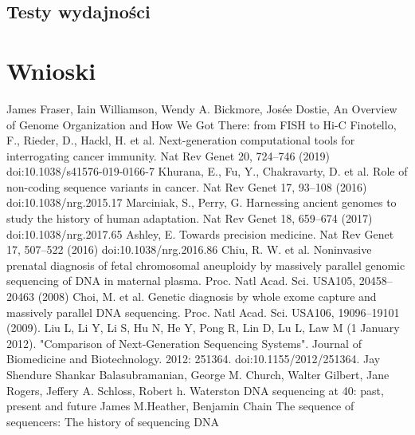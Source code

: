 \documentclass[a4paper,11pt,twoside]{report}
\theoremstyle{definition}
\begin{document}
\section*{Testy wydajności}

\chapter{Wnioski}

\begin{thebibliography}{20}%
James Fraser, Iain Williamson, Wendy A. Bickmore,  Josée Dostie, An Overview of Genome Organization and How We Got There: from FISH to Hi-C
Finotello, F., Rieder, D., Hackl, H. et al. Next-generation computational tools for interrogating cancer immunity. Nat Rev Genet 20, 724–746 (2019) doi:10.1038/s41576-019-0166-7
Khurana, E., Fu, Y., Chakravarty, D. et al. Role of non-coding sequence variants in cancer. Nat Rev Genet 17, 93–108 (2016) doi:10.1038/nrg.2015.17
 Marciniak, S., Perry, G. Harnessing ancient genomes to study the history of human adaptation. Nat Rev Genet 18, 659–674 (2017) doi:10.1038/nrg.2017.65
 Ashley, E. Towards precision medicine. Nat Rev Genet 17, 507–522 (2016) doi:10.1038/nrg.2016.86
 Chiu, R. W. et al. Noninvasive prenatal diagnosis of fetal chromosomal aneuploidy by massively parallel genomic sequencing of DNA in maternal plasma. Proc. Natl Acad. Sci. USA105, 20458–20463 (2008)
 Choi, M. et al. Genetic diagnosis by whole exome capture and massively parallel DNA sequencing. Proc. Natl Acad. Sci. USA106, 19096–19101 (2009).
 Liu L, Li Y, Li S, Hu N, He Y, Pong R, Lin D, Lu L, Law M (1 January 2012). "Comparison of Next-Generation Sequencing Systems". Journal of Biomedicine and Biotechnology. 2012: 251364. doi:10.1155/2012/251364.
 Jay Shendure Shankar Balasubramanian, George M. Church, Walter Gilbert, Jane Rogers, Jeffery A. Schloss, Robert h. Waterston DNA sequencing at 40: past, present and future
 James M.Heather, Benjamin Chain The sequence of sequencers: The history of sequencing DNA

\end{thebibliography}
\end{document}
